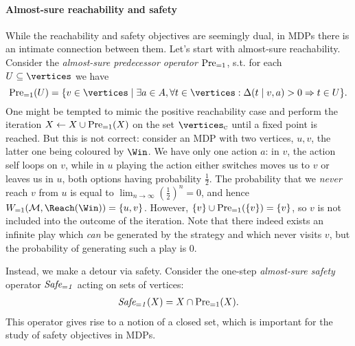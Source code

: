 \paragraph{Almost-sure reachability and safety} While the reachability and safety objectives are seemingly dual, in MDPs there is an intimate connection between them.
%
Let's start with almost-sure reachability. Consider the  \emph{almost-sure predecessor operator $\text{Pre}_{=1}$}, s.t. for each $U \subseteq \vertices$ we have $$\PreAS(U) = \{v \in \vertices \mid \exists a \in \actions, \forall t \in 
\vertices: \probTranFunc(t\mid v,a)>0 \Rightarrow t \in U \}.$$
One might be tempted to mimic the positive reachability case and perform the iteration $ X \leftarrow X \cup \text{Pre}_{=1}(X) $ on the set $ \vertices_{\genColour} $ until a fixed point is reached.
But this 
is not correct: consider an MDP with two vertices, $u,v$, the latter one being coloured by $\Win$. We have only one action $a$: in $v$, the action self loops on $v$, while in $u$ playing the action either switches moves us to $v$ or leaves us in $u$, both options having probability $\frac{1}{2}$. The probability that we \emph{never} reach $v$ from $u$ is 
equal to $\lim_{n\rightarrow \infty} \left(\frac{1}{2}\right)^n = 0$, and hence 
$\winAS(\mdp,\Reach(\Win))=\{u,v\}$. However, $\{v\}\cup\text{Pre}_{=1}(\{v\})=\{v\}$, so 
$v$ is not included into the outcome of the iteration. Note that there indeed exists an infinite play which \emph{can} be generated by the strategy and 
which 
never visits $v$, but the probability of generating such a play is $0$. 

Instead, we make a detour via safety. Consider the one-step \emph{almost-sure safety} operator $\mathit{Safe_{=1}}$ acting on sets of vertices:
%
\begin{align*}
\mathit{Safe_{=1}}(X)= X \cap \text{Pre}_{=1}(X).
\end{align*}
%
This operator gives rise to a notion of a closed set, which is important for the study of safety objectives in MDPs.


